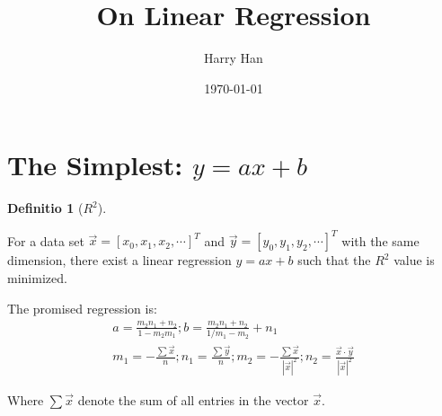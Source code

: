 \documentclass[12pt, a4paper]{article}
\title{On Linear Regression}
\author{Harry Han}
\date{\today}
\theoremstyle{definition}
\newtheorem{definition}{Definitio}[section]
\theoremstyle{remark}
\begin{document}
\maketitle

\section{The Simplest: $y=ax+b$}
\begin{definition}[$R^2$]
	
\end{definition}

For a data set $\vec{x}=[x_0, x_1, x_2, \cdots]^T$ and $\vec{y}=[y_0, y_1, y_2, \cdots]^T$ with the same dimension, 
there exist a linear regression $y=ax+b$ such that the $R^2$ value is minimized. 

The promised regression is:
\begin{equation}
\begin{multlined}
	a = \frac{m_2n_1+n_2}{1-m_2m_1}; 
	b = \frac{m_2n_1+n_2}{1/m_1-m_2}+n_1
	\\
	m_1 = -\frac{\sum \vec{x}}{n}; n_1 = \frac{\sum \vec{y}}{n}; m_2=-\frac{\sum \vec{x}}{|\vec{x}|^2}; n_2 = \frac{\vec{x}\cdot \vec{y}}{|\vec{x}|^2}
\end{multlined}
\end{equation}

Where $\sum \vec{x}$ denote the sum of all entries in the vector $\vec{x}$.
\end{document}
